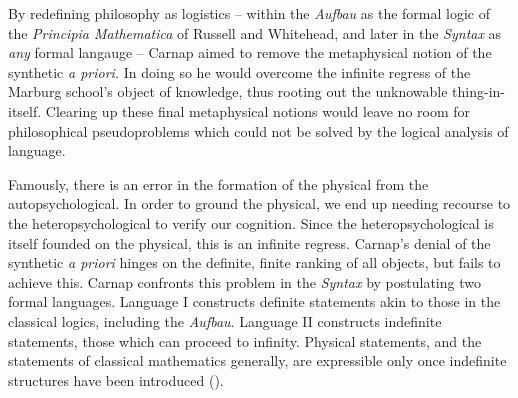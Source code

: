 \documentclass[leqno, 12pt]{turabian-researchpaper}
\begin{document}
	\iffalse Carnap takes the neutrality of his constitutional system as something
	of its highlight: it is this neutrality which allows it to become the common basis
	for the three main strands of epistemology: realism, idealism, and
	phenomenalism \autocite[\S178]{carnap2003}. \fi


	By redefining philosophy as logistics -- within the \textit{Aufbau} as the
	formal logic of the \textit{Principia Mathematica} of Russell and Whitehead,
	and later in the \textit{Syntax} as \emph{any} formal langauge -- Carnap aimed
	to remove the metaphysical notion of the synthetic \textit{a priori.} In doing
	so he would overcome the infinite regress of the Marburg school's object of
	knowledge, thus rooting out the unknowable thing-in-itself. Clearing up these
	final metaphysical notions would leave no room for philosophical
	pseudoproblems which could not be solved by the logical analysis of language.

	Famously, there is an error in the formation of the physical from the autopsychological.
	In order to ground the physical, we end up needing recourse to the heteropsychological
	to verify our cognition. Since the heteropsychological is itself founded on
	the physical, this is an infinite regress. Carnap's denial of the synthetic
	\textit{a priori} hinges on the definite, finite ranking of all objects, but fails
	to achieve this. Carnap confronts this problem in the \textit{Syntax} by postulating
	two formal languages. Language I constructs definite statements akin to those
	in the classical logics, including the \textit{Aufbau}. Language II constructs
	indefinite statements, those which can proceed to infinity. Physical statements,
	and the statements of classical mathematics generally, are expressible only once
	indefinite structures have been introduced ().
\end{document}
